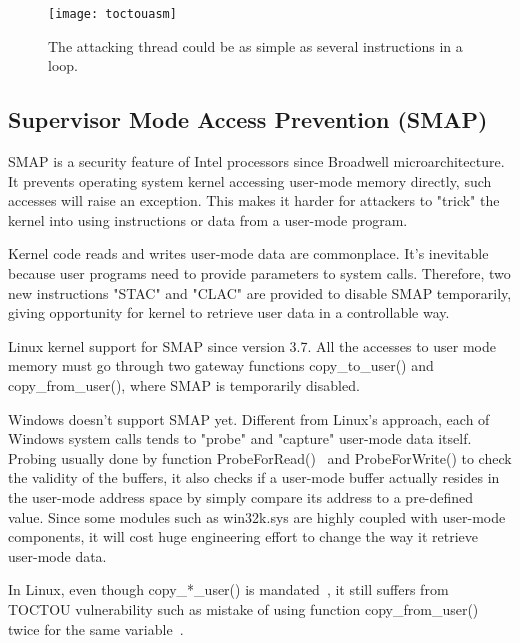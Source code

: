 \begin{figure}[h]
  \texttt{[image: toctouasm]}
  \centering
  \caption{The attacking thread could be as simple as several instructions in a loop.}
  \label{fig:toctouasm}
\end{figure}


\subsection{Supervisor Mode Access Prevention (SMAP)}
SMAP is a security feature of Intel processors since Broadwell microarchitecture. It prevents operating system kernel accessing user-mode memory directly, such accesses will raise an exception. This makes it harder for attackers to "trick" the kernel into using instructions or data from a user-mode program. 

Kernel code reads and writes user-mode data are commonplace. It's inevitable because user programs need to provide parameters to system calls. Therefore, two new instructions "STAC" and "CLAC" are provided to disable SMAP temporarily, giving opportunity for kernel to retrieve user data in a controllable way.

Linux kernel support for SMAP since version 3.7. All the accesses to user mode memory must go through two gateway functions copy_to_user() and copy_from_user(), where SMAP is temporarily disabled.

Windows doesn't support SMAP yet. Different from Linux's approach, each of Windows system calls tends to "probe" and "capture" user-mode data itself. Probing usually done by function ProbeForRead()~\cite{probeforread} and ProbeForWrite() to check the validity of the buffers, it also checks if a user-mode buffer actually resides in the user-mode address space by simply compare its address to a pre-defined value. Since some modules such as win32k.sys are highly coupled with user-mode components, it will cost huge engineering effort to change the way it retrieve user-mode data.

In Linux, even though copy_*_user() is mandated~\cite{corbet2012linuxsmap}, it still suffers from TOCTOU vulnerability such as mistake of using function copy_from_user() twice for the same variable~\cite{double-fetch-linux}. 